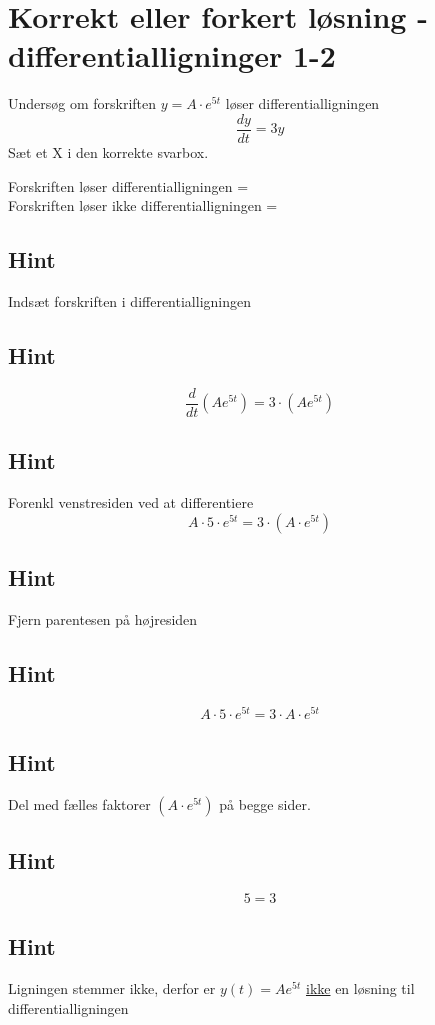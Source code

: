 \documentclass{article}
\newenvironment{exercise}[1]{\newpage\section{#1}}{}
\newcommand{\answerbox}[1]{\fbox{$#1$}}
\newcommand{\hint}{\subsection*{Hint}}
\begin{document}
\begin{exercise}{Korrekt eller forkert løsning - differentialligninger 1-2}
	
	
	Undersøg om forskriften $y = A \cdot e^{5t}$ løser differentialligningen
	\[
	\frac{dy}{dt} = 3y
	\]
	Sæt et X i den korrekte svarbox.
	
	Forskriften løser differentialligningen = \answerbox{} \\
	
	Forskriften løser ikke differentialligningen = \answerbox{X}
	
	\hint
	
	Indsæt forskriften i differentialligningen
	
	\hint
	\[
	\frac{d}{dt} \left( A e^{5t}\right) = 3 \cdot \left( A e^{5t} \right)
	\]
	
	
	\hint
	
	Forenkl venstresiden ved at differentiere
	\[
	A \cdot 5 \cdot e^{5t} = 3 \cdot \left(A \cdot e^{5t} \right)
	\]
	
	\hint
	
	Fjern parentesen på højresiden
	
	\hint
	\[
	A \cdot5 \cdot e^{5t} = 3 \cdot A \cdot e^{5t}
	\]
	
	\hint
	Del med fælles faktorer $\left( A \cdot e^{5t} \right)$ på begge sider.
	
	\hint
	
	\[
	5 = 3
	\]
	
	
	\hint
	
	Ligningen stemmer ikke, derfor er $y(t) = A e^{5t}$ \underline{ikke} en løsning til differentialligningen
	
\end{exercise}

\newpage
\end{document}
